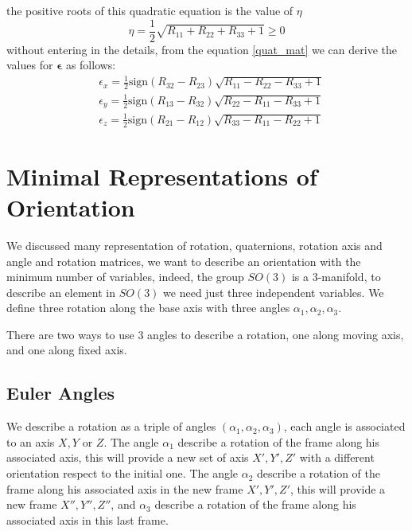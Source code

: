 \documentclass[10pt, letterpaper]{report}
\begin{document}
the positive roots of this quadratic equation is the value of $\eta$\begin{equation}
    \eta=\frac{1}{2}\sqrt{R_{11}+R_{22}+R_{33}+1}\ge 0 
\end{equation}
without entering in the details, from the equation \eqref{quat_mat} we can derive the values for $\boldsymbol{\epsilon}$ as follows:\begin{align}
    &\epsilon_x=\frac{1}{2}\text{sign}(R_{32}-R_{23})\sqrt{R_{11}-R_{22}-R_{33}+1}\\
    &\epsilon_y=\frac{1}{2}\text{sign}(R_{13}-R_{32})\sqrt{R_{22}-R_{11}-R_{33}+1}\\
    &\epsilon_z=\frac{1}{2}\text{sign}(R_{21}-R_{12})\sqrt{R_{33}-R_{11}-R_{22}+1}
\end{align}
\section{Minimal Representations of Orientation}
We discussed many representation of rotation, quaternions, rotation axis and angle and  rotation matrices, we want to describe an orientation with the minimum number of variables, indeed, the group $SO(3)$ is a 3-manifold, to describe an element in $SO(3)$ we need just three independent variables. We define three rotation along the base axis with three angles $\alpha_1,\alpha_2,\alpha_3$.\bigskip 

There are two ways to use 3 angles to describe a rotation, one along moving axis, and one along fixed axis.
\subsection{Euler Angles}
We describe a rotation as a triple of angles $(\alpha_1,\alpha_2,\alpha_3)$, each angle is associated to an axis $X,Y$ or $Z$. The angle $\alpha_1$ describe a rotation of the frame along his associated axis, this will provide a new set of axis $X',Y',Z'$ with a different orientation respect to the initial one. The angle $\alpha_2$ describe a rotation of the frame along his associated axis in the new frame $X',Y',Z'$, this will provide a new frame $X'',Y'',Z''$, and  $\alpha_3$ describe a rotation of the frame along his associated axis in this last frame.\bigskip 
\end{document}
